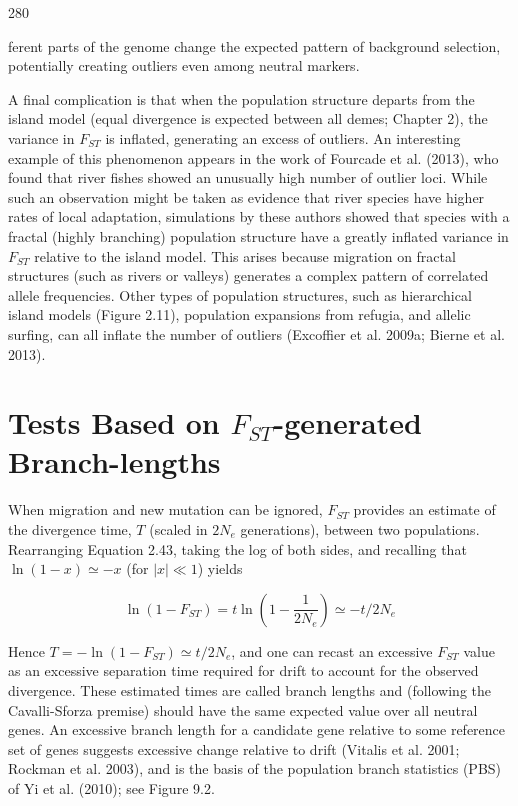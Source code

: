 \documentclass{article}
\begin{document}
280

ferent parts of the genome change the expected pattern of background selection, potentially creating outliers even among neutral markers.

A final complication is that when the population structure departs from the island model (equal divergence is expected between all demes; Chapter 2), the variance in  $ F_{ST} $ is inflated, generating an excess of outliers. An interesting example of this phenomenon appears in the work of Fourcade et al. (2013), who found that river fishes showed an unusually high number of outlier loci. While such an observation might be taken as evidence that river species have higher rates of local adaptation, simulations by these authors showed that species with a fractal (highly branching) population structure have a greatly inflated variance in  $ F_{ST} $ relative to the island model. This arises because migration on fractal structures (such as rivers or valleys) generates a complex pattern of correlated allele frequencies. Other types of population structures, such as hierarchical island models (Figure 2.11), population expansions from refugia, and allelic surfing, can all inflate the number of outliers (Excoffier et al. 2009a; Bierne et al. 2013).

\section{Tests Based on  $ F_{ST} $-generated Branch-lengths}
When migration and new mutation can be ignored,  $ F_{ST} $ provides an estimate of the divergence time,  $ T $ (scaled in  $ 2N_e $ generations), between two populations. Rearranging Equation 2.43, taking the log of both sides, and recalling that  $ \ln(1 - x) \simeq -x $ (for  $ |x| \ll 1 $) yields

\begin{equation}
\ln\left(1-F_{ST}\right)=t\ln\left(1-\frac{1}{2N_{e}}\right)\simeq-t/2N_{e}
\tag{9.9}
\label{eq:9_9}
\end{equation}

Hence  $ T = -\ln(1 - F_{ST}) \simeq t/2N_e $, and one can recast an excessive  $ F_{ST} $ value as an excessive separation time required for drift to account for the observed divergence. These estimated times are called branch lengths and (following the Cavalli-Sforza premise) should have the same expected value over all neutral genes. An excessive branch length for a candidate gene relative to some reference set of genes suggests excessive change relative to drift (Vitalis et al. 2001; Rockman et al. 2003), and is the basis of the population branch statistics (PBS) of Yi et al. (2010); see Figure 9.2.
\end{document}
